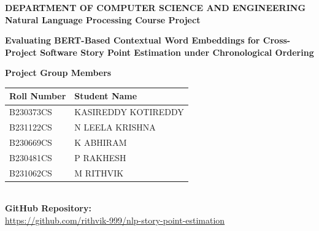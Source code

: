 \documentclass[11pt,a4paper]{article}
\begin{document}
\begin{titlepage}
\centering

\vspace*{0.6cm}
{\color{primarynavy}\LARGE\bfseries DEPARTMENT OF COMPUTER SCIENCE AND ENGINEERING}\\[0.4em]
{\color{accentblue}\large\bfseries Natural Language Processing Course Project}

\vspace{2.2cm}

{\color{primarynavy}\LARGE\bfseries Evaluating BERT-Based Contextual Word Embeddings for Cross-Project Software Story Point Estimation under Chronological Ordering}\\[1.6cm]

\noindent{}

\vspace{2.0cm}

\textbf{\color{primarynavy}\large Project Group Members}\\[0.8em]
\begin{tabular}{ll}
\toprule
\textbf{Roll Number} & \textbf{Student Name} \\
\midrule
B230373CS & KASIREDDY KOTIREDDY \\
B231122CS & N LEELA KRISHNA \\
B230669CS & K ABHIRAM \\
B230481CS & P RAKHESH \\
B231062CS & M RITHVIK \\
\bottomrule
\end{tabular}

\vfill

\noindent\makebox[\linewidth]{\color{bordergray}\rule{0.85\linewidth}{0.8pt}}\\[0.6em]
\textbf{\color{primarynavy}\large GitHub Repository:}\\[0.3em]
\url{https://github.com/rithvik-999/nlp-story-point-estimation}\\[0.4em]
\noindent\makebox[\linewidth]{\color{bordergray}\rule{0.85\linewidth}{0.8pt}}

\vspace{0.6cm}

\end{titlepage}
\end{document}
